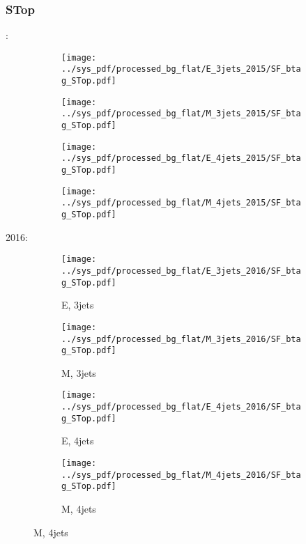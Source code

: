 \documentclass{beamer}
\begin{document}
\begin{frame}
\frametitle{STop}
\fontsize{5}{1}:
\begin{figure}
\centering
\begin{subfigure}[b]{0.24\textwidth}
\texttt{[image: ../sys\_pdf/processed\_bg\_flat/E\_3jets\_2015/SF\_btag\_STop.pdf]}
\end{subfigure}
\begin{subfigure}[b]{0.24\textwidth}
\texttt{[image: ../sys\_pdf/processed\_bg\_flat/M\_3jets\_2015/SF\_btag\_STop.pdf]}
\end{subfigure}
\begin{subfigure}[b]{0.24\textwidth}
\texttt{[image: ../sys\_pdf/processed\_bg\_flat/E\_4jets\_2015/SF\_btag\_STop.pdf]}
\end{subfigure}
\begin{subfigure}[b]{0.24\textwidth}
\texttt{[image: ../sys\_pdf/processed\_bg\_flat/M\_4jets\_2015/SF\_btag\_STop.pdf]}
\end{subfigure}
\end{figure}
2016:
\begin{figure}
\centering
\begin{subfigure}[b]{0.24\textwidth}
\texttt{[image: ../sys\_pdf/processed\_bg\_flat/E\_3jets\_2016/SF\_btag\_STop.pdf]}
\captionsetup{font=tiny}
\caption{E, 3jets}
\end{subfigure}
\begin{subfigure}[b]{0.24\textwidth}
\texttt{[image: ../sys\_pdf/processed\_bg\_flat/M\_3jets\_2016/SF\_btag\_STop.pdf]}
\captionsetup{font=tiny}
\caption{M, 3jets}
\end{subfigure}
\begin{subfigure}[b]{0.24\textwidth}
\texttt{[image: ../sys\_pdf/processed\_bg\_flat/E\_4jets\_2016/SF\_btag\_STop.pdf]}
\captionsetup{font=tiny}
\caption{E, 4jets}
\end{subfigure}
\begin{subfigure}[b]{0.24\textwidth}
\texttt{[image: ../sys\_pdf/processed\_bg\_flat/M\_4jets\_2016/SF\_btag\_STop.pdf]}
\captionsetup{font=tiny}
\caption{M, 4jets}
\end{subfigure}
\end{figure}
\end{frame}
\end{document}
